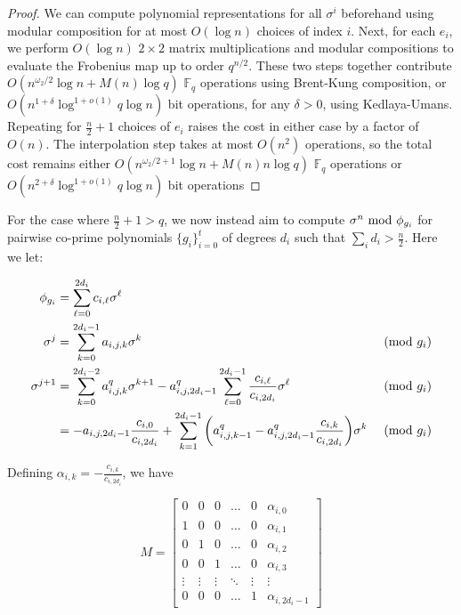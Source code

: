 \documentclass{jams-l}
\theoremstyle{remark}
\numberwithin{equation}{section}
\begin{document}
\begin{proof}
We can compute polynomial representations for all $\sigma^i$ beforehand using modular composition for at most $O(\log n)$ choices of index $i$. Next, for each $e_i$, we perform $O(\log n)$ $2\times 2$ matrix multiplications and modular compositions to evaluate the Frobenius map up to order $q^{n/2}$. These two steps together contribute $O(n^{\omega_2/2} \log n + M(n) \log q )$ $\mathbb{F}_q$ operations using Brent-Kung composition, or $O(n^{1+\delta} \log^{1 + o(1)} q \log n)$ bit operations, for any $\delta > 0$, using Kedlaya-Umans. Repeating for $\frac{n}{2} + 1$ choices of $e_i$ raises the cost in either case by a factor of $O(n)$. The interpolation step takes at most $O(n^2)$ operations, so the total cost remains either $O(n^{\omega_2/2 + 1} \log n + M(n) n \log q)$ $\mathbb{F}_q$ operations  or $O(n^{2+\delta} \log^{1 + o(1)} q \log n)$ bit operations

\end{proof}




For the case where $\frac{n}{2} + 1 > q$, we now instead aim to compute $\sigma^n \textnormal{ mod } \phi_{g_i}$ for pairwise co-prime polynomials $\{g_i\}_{i=0}^{t}$ of degrees $d_i$ such that $\sum_{i} d_i > \frac{n}{2}$. Here we let:

\begin{align*}
\phi_{g_i} & = \sum_{\ell = 0}^{2d_i} c_{i,\ell} \sigma^{\ell} & \\
\sigma^{j} & = \sum_{k=0}^{2d_i-1}a_{i,j,k}\sigma^k & \textnormal{ (mod } g_i \textnormal{)} \\
\sigma^{j+1} & =  \sum_{k=0}^{2d_i-2}a_{i,j,k}^q\sigma^{k+1} - a_{i,j,2d_i-1}^q\sum_{\ell = 0}^{2d_i - 1} \frac{c_{i,\ell}}{c_{i,2d_i}} \sigma^{\ell}  & \textnormal{ (mod } g_i \textnormal{)}\\
 & = -a_{i,j,2d_i -1}\frac{c_{i,0}}{c_{i,2d_i}} + \sum_{k=1}^{2d_{i}-1} \bigg( a_{i,j,k -1}^q - a_{i,j,2d_i-1}^q\frac{c_{i,k}}{c_{i,2d_i}}\bigg)\sigma^k & \textnormal{ (mod } g_i \textnormal{)}
\end{align*}

Defining $\alpha_{i,k} = -\frac{c_{i,k}}{c_{i,2d_i}}$, we have

\[M = \begin{bmatrix} 0 & 0 & 0 & \ldots & 0 & \alpha_{i,0} \\
                      1 & 0 & 0 & \ldots & 0 & \alpha_{i,1} \\
                      0 & 1 & 0 & \ldots & 0 & \alpha_{i,2} \\
                      0 & 0 & 1 & \ldots & 0 & \alpha_{i,3} \\
                      \vdots & \vdots & \vdots & \ddots & \vdots & \vdots \\
                      0 & 0 & 0 & \ldots & 1 & \alpha_{i,2d_i - 1}
\end{bmatrix}\]
\end{document}
